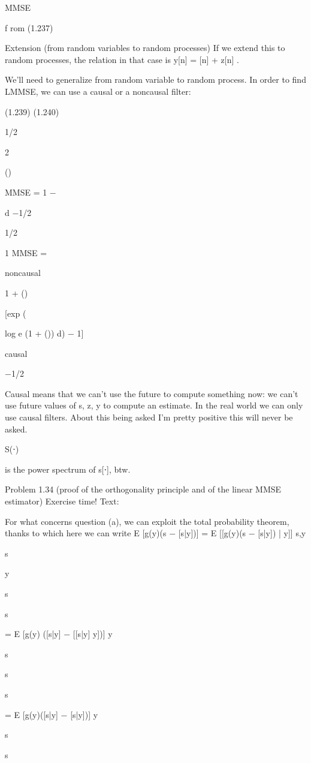 {MMSE

f rom (1.237)

Extension (from random variables to random processes)
If we extend this to random processes, the relation in that case is y[n] = \sqrt{\rhos}[n] + z[n] .

We'll need to generalize from random variable to random process.
In order to find LMMSE, we can use a causal or a noncausal filter:

(1.239)
(1.240)

1/2

\rhoS

2

(\nu)

MMSE = 1 − \int

d\nu
−1/2

1/2

1 MMSE =

noncausal

1 + \rhoS(\nu)

[exp (\int
\rho

log e (1 + \rhoS(\nu)) d\nu) − 1]

causal

−1/2

Causal means that we can't use the future to compute something now: we can't use future values of s, z, y to compute an estimate.
In the real world we can only use causal filters.
​About this being asked I'm pretty positive this will never be asked.

S(⋅)

is the power spectrum of s[⋅], btw.

Problem 1.34 (proof of the orthogonality principle and of the linear MMSE estimator)
Exercise time!
Text:

For what concerns question (a), we can exploit the total probability theorem, thanks to which here we can write E [g(y)(s − [s|y])] = E [[g(y)(s − [s|y]) | y]]
s,y

s

y

s

s

= E [g(y) ([s|y] − [[s|y] y])]
y

s

s

s

= E [g(y)([s|y] − [s|y])]
y

s

s

}
